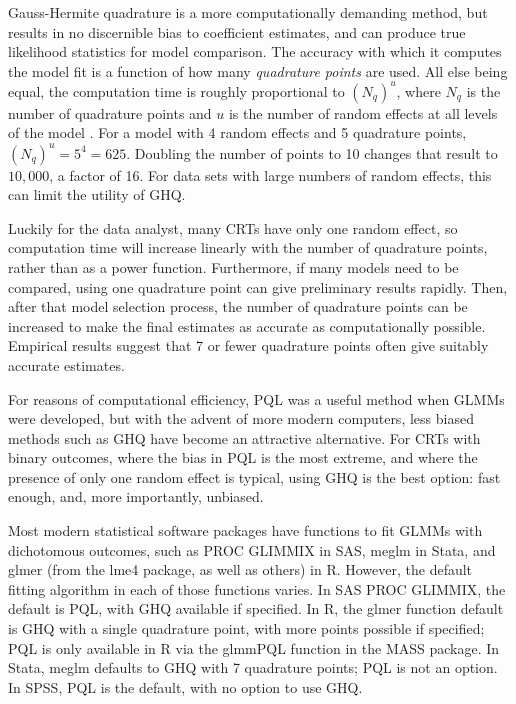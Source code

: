 \documentclass[Afour,times,sagev,doublespace]{sagej}
\begin{document}
Gauss-Hermite quadrature is a more computationally demanding method, but results in no discernible bias to coefficient estimates, and can produce true likelihood statistics for model comparison. The accuracy with which it computes the model fit is a function of how many \textit{quadrature points} are used. All else being equal, the computation time is roughly proportional to $(N_q)^u$, where $N_q$ is the number of quadrature points and $u$ is the number of random effects at all levels of the model \cite{statacorp_stata_2017}\cite{pinheiro_efficient_2006}. For a model with 4 random effects and 5 quadrature points, $(N_q)^u = 5^4 = 625$. Doubling the number of points to 10 changes that result to $10,000$, a factor of 16. For data sets with large numbers of random effects, this can limit the utility of GHQ.

Luckily for the data analyst, many CRTs have only one random effect, so computation time will increase linearly with the number of quadrature points, rather than as a power function. Furthermore, if many models need to be compared, using one quadrature point can give preliminary results rapidly. Then, after that model selection process, the number of quadrature points can be increased to make the final estimates as accurate as computationally possible. Empirical results suggest that 7 or fewer quadrature points often give suitably accurate estimates\cite{pinheiro_approximations_1995}.

For reasons of computational efficiency, PQL was a useful method when GLMMs were developed, but with the advent of more modern computers, less biased methods such as GHQ have become an attractive alternative. For CRTs with binary outcomes, where the bias in PQL is the most extreme\cite{ng_estimation_2006}\cite{lin_estimation_2007}, and where the presence of only one random effect is typical, using GHQ is the best option: fast enough, and, more importantly, unbiased.

Most modern statistical software packages have functions to fit GLMMs with dichotomous outcomes, such as PROC GLIMMIX in SAS, meglm in Stata, and glmer (from the lme4 package, as well as others) in R. However, the default fitting algorithm in each of those functions varies. In SAS PROC GLIMMIX, the default is PQL, with GHQ available if specified. In R, the glmer function default is GHQ with a single quadrature point, with more points possible if specified; PQL is only available in R via the glmmPQL function in the MASS package. In Stata, meglm defaults to GHQ with 7 quadrature points; PQL is not an option. In SPSS, PQL is the default, with no option to use GHQ.
\end{document}
